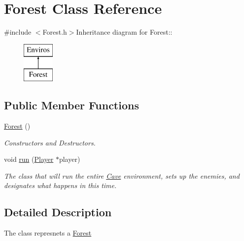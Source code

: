 \hypertarget{classForest}{
\section{Forest Class Reference}
\label{classForest}
}


{\ttfamily \#include $<$Forest.h$>$}Inheritance diagram for Forest::\begin{figure}[H]
\begin{center}
\leavevmode
\includegraphics[height=2cm]{classForest}
\end{center}
\end{figure}
\subsection*{Public Member Functions}
\begin{DoxyCompactItemize}
\item 
\hypertarget{classForest_af9ad2787ae306cb4da8d7443da124d15}{
\hyperlink{classForest_af9ad2787ae306cb4da8d7443da124d15}{Forest} ()}
\label{classForest_af9ad2787ae306cb4da8d7443da124d15}

\begin{DoxyCompactList}\small\item\em Constructors and Destructors. \item\end{DoxyCompactList}\item 
void \hyperlink{classForest_a22996cfd5e18402e640316b7a6fb5feb}{run} (\hyperlink{classPlayer}{Player} $\ast$player)
\begin{DoxyCompactList}\small\item\em The class that will run the entire \hyperlink{classCave}{Cave} environment, sets up the enemies, and designates what happens in this time. \item\end{DoxyCompactList}\end{DoxyCompactItemize}


\subsection{Detailed Description}
The class represnets a \hyperlink{classForest}{Forest} 

